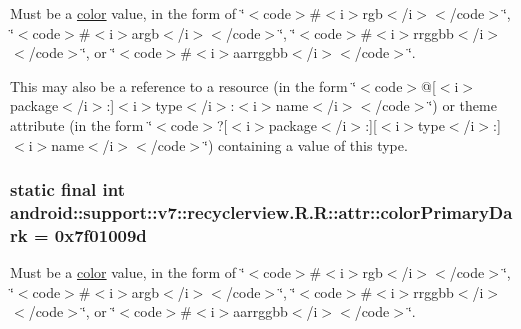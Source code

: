Must be a \hyperlink{classandroid_1_1support_1_1v7_1_1recyclerview_1_1_r_1_1color}{color} value, in the form of \char`\"{}$<$code$>$\#$<$i$>$rgb$<$/i$>$$<$/code$>$\char`\"{}, \char`\"{}$<$code$>$\#$<$i$>$argb$<$/i$>$$<$/code$>$\char`\"{}, \char`\"{}$<$code$>$\#$<$i$>$rrggbb$<$/i$>$$<$/code$>$\char`\"{}, or \char`\"{}$<$code$>$\#$<$i$>$aarrggbb$<$/i$>$$<$/code$>$\char`\"{}. 

This may also be a reference to a resource (in the form \char`\"{}$<$code$>$@\mbox{[}$<$i$>$package$<$/i$>$:\mbox{]}$<$i$>$type$<$/i$>$:$<$i$>$name$<$/i$>$$<$/code$>$\char`\"{}) or theme attribute (in the form \char`\"{}$<$code$>$?\mbox{[}$<$i$>$package$<$/i$>$:\mbox{]}\mbox{[}$<$i$>$type$<$/i$>$:\mbox{]}$<$i$>$name$<$/i$>$$<$/code$>$\char`\"{}) containing a value of this type. \hypertarget{classandroid_1_1support_1_1v7_1_1recyclerview_1_1_r_1_1attr_0bd6eaf47646f18cca2f2087240a7cae}{
\subsubsection[{colorPrimaryDark}]{\setlength{\rightskip}{0pt plus 5cm}static final int android::support::v7::recyclerview.R.R::attr::colorPrimaryDark = 0x7f01009d}}
\label{classandroid_1_1support_1_1v7_1_1recyclerview_1_1_r_1_1attr_0bd6eaf47646f18cca2f2087240a7cae}


Must be a \hyperlink{classandroid_1_1support_1_1v7_1_1recyclerview_1_1_r_1_1color}{color} value, in the form of \char`\"{}$<$code$>$\#$<$i$>$rgb$<$/i$>$$<$/code$>$\char`\"{}, \char`\"{}$<$code$>$\#$<$i$>$argb$<$/i$>$$<$/code$>$\char`\"{}, \char`\"{}$<$code$>$\#$<$i$>$rrggbb$<$/i$>$$<$/code$>$\char`\"{}, or \char`\"{}$<$code$>$\#$<$i$>$aarrggbb$<$/i$>$$<$/code$>$\char`\"{}. 

